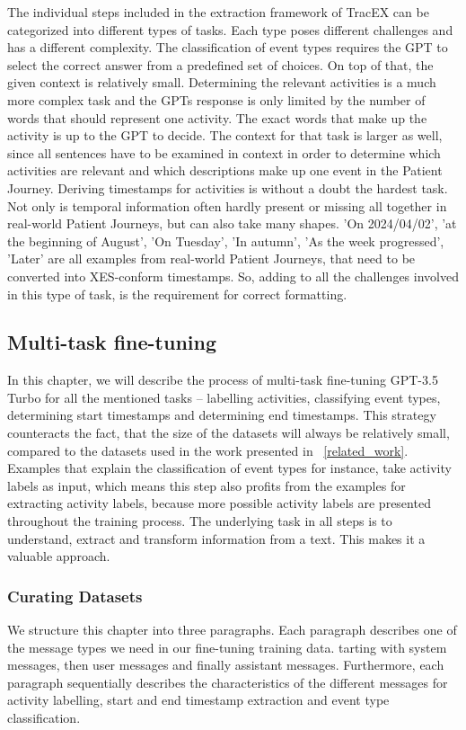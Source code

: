 The individual steps included in the extraction framework of TracEX can be categorized into different types of tasks. Each type poses different challenges and has a different complexity. The classification of event types requires the GPT to select the correct answer from a predefined set of choices. On top of that, the given context is relatively small. Determining the relevant activities is a much more complex task and the GPTs response is only limited by the number of words that should represent one activity. The exact words that make up the activity is up to the GPT to decide. The context for that task is larger as well, since all sentences have to be examined in context in order to determine which activities are relevant and which descriptions make up one event in the Patient Journey. Deriving timestamps for activities is without a doubt the hardest task. Not only is temporal information often hardly present or missing all together in real-world Patient Journeys, but can also take many shapes. 'On 2024/04/02', 'at the beginning of August', 'On Tuesday', 'In autumn', 'As the week progressed', 'Later' are all examples from real-world Patient Journeys, that need to be converted into XES-conform timestamps. So, adding to all the challenges involved in this type of task, is the requirement for correct formatting.

\subsection{Multi-task fine-tuning}\label{sec:multi-task-ft}
In this chapter, we will describe the process of multi-task fine-tuning GPT-3.5 Turbo for all the mentioned tasks – labelling activities, classifying event types,  determining start timestamps and determining end timestamps. This strategy counteracts the fact, that the size of the datasets will always be relatively small, compared to the datasets used in the work presented in ~\autoref{related_work}. Examples that explain the classification of event types for instance, take activity labels as input, which means this step also profits from the examples for extracting activity labels, because more possible activity labels are presented throughout the training process. The underlying task in all steps is to understand, extract and transform information from a text. This makes it a valuable approach.

\subsubsection{Curating Datasets}\label{sec:curating_data}
We structure this chapter into three paragraphs. Each paragraph describes one of the message types we need in our fine-tuning training data. tarting with system messages, then user messages and finally assistant messages. Furthermore, each paragraph sequentially describes the characteristics of the different messages for activity labelling, start and end timestamp extraction and event type classification.
